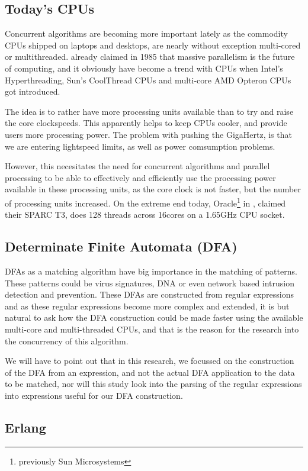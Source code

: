 \documentclass[a4paper,11pt]{report}
\begin{document}
\subsection{Today's CPUs}
Concurrent algorithms are becoming more important lately as the
commodity CPUs shipped on laptops and desktops, are nearly without
exception multi-cored or multithreaded. \cite{ActorModel} already
claimed in 1985 that massive parallelism is the future of computing,
and it obviously have become a trend with CPUs when Intel's
Hyperthreading, Sun's CoolThread CPUs and multi-core AMD Opteron CPUs
got introduced.

  The idea is to rather have more processing units
available than to try and raise the core clockspeeds. This apparently
helps to keep CPUs cooler, and provide users more processing
power. The problem with pushing the GigaHertz, is that we are entering
lightspeed limits, as well as power comsumption problems.

 However, this necesitates the need for concurrent algorithms
and parallel processing to be able to effectively and efficiently use
the processing power available in these processing units, as the core
clock is not faster, but the number of processing units increased.  On
the extreme end today, Oracle\footnote{previously Sun Microsystems} in
\cite{url:T3}, claimed their SPARC T3, does 128 threads across 16cores
on a 1.65GHz CPU socket.

\subsection{Determinate Finite Automata (DFA)}
DFAs as a matching algorithm have big importance in the matching of
patterns. These patterns could be virus signatures, DNA or even
network based intrusion detection and prevention. These DFAs are
constructed from regular expressions and as these regular expressions
become more complex and extended, it is but natural to ask how the DFA
construction could be made faster using the available
multi-core and multi-threaded CPUs, and that is the reason for the
research into the concurrency of this algorithm.

We will have to point out that in this research, we focussed on the
construction of the DFA from an expression, and not the actual DFA
application to the data to be matched, nor will this study look into
the parsing of the regular expressions into expressions useful for our
DFA construction.


\subsection{Erlang}
\end{document}
